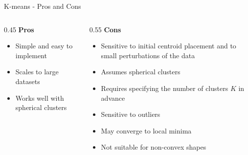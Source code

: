 \begin{frame}[allowframebreaks]{K-means - Pros and Cons}
\begin{columns}
    \begin{column}{0.45\textwidth}
        \textbf{Pros}
        \begin{itemize}
            \setlength{\itemsep}{1em}
            \item Simple and easy to implement
            \item Scales to large datasets
            \item Works well with spherical clusters
        \end{itemize}
    \end{column}
    \begin{column}{0.55\textwidth}
        \textbf{Cons}
        \begin{itemize}
            \setlength{\itemsep}{1em}
            \item Sensitive to initial centroid placement and to small perturbations of the data
            \item Assumes spherical clusters
            \item Requires specifying the number of clusters $K$ in advance
            \item Sensitive to outliers
            \item May converge to local minima
            \item Not suitable for non-convex shapes
        \end{itemize}
    \end{column}
\end{columns}
\end{frame}